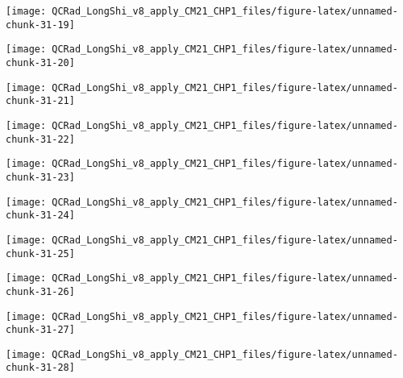 \documentclass[
  10pt,
  a4paper,oneside]{article}
\begin{document}
\begin{center}\texttt{[image: QCRad\_LongShi\_v8\_apply\_CM21\_CHP1\_files/figure-latex/unnamed-chunk-31-19]} \end{center}

\begin{center}\texttt{[image: QCRad\_LongShi\_v8\_apply\_CM21\_CHP1\_files/figure-latex/unnamed-chunk-31-20]} \end{center}

\begin{center}\texttt{[image: QCRad\_LongShi\_v8\_apply\_CM21\_CHP1\_files/figure-latex/unnamed-chunk-31-21]} \end{center}

\begin{center}\texttt{[image: QCRad\_LongShi\_v8\_apply\_CM21\_CHP1\_files/figure-latex/unnamed-chunk-31-22]} \end{center}

\begin{center}\texttt{[image: QCRad\_LongShi\_v8\_apply\_CM21\_CHP1\_files/figure-latex/unnamed-chunk-31-23]} \end{center}

\begin{center}\texttt{[image: QCRad\_LongShi\_v8\_apply\_CM21\_CHP1\_files/figure-latex/unnamed-chunk-31-24]} \end{center}

\begin{center}\texttt{[image: QCRad\_LongShi\_v8\_apply\_CM21\_CHP1\_files/figure-latex/unnamed-chunk-31-25]} \end{center}

\begin{center}\texttt{[image: QCRad\_LongShi\_v8\_apply\_CM21\_CHP1\_files/figure-latex/unnamed-chunk-31-26]} \end{center}

\begin{center}\texttt{[image: QCRad\_LongShi\_v8\_apply\_CM21\_CHP1\_files/figure-latex/unnamed-chunk-31-27]} \end{center}

\begin{center}\texttt{[image: QCRad\_LongShi\_v8\_apply\_CM21\_CHP1\_files/figure-latex/unnamed-chunk-31-28]} \end{center}
\end{document}
